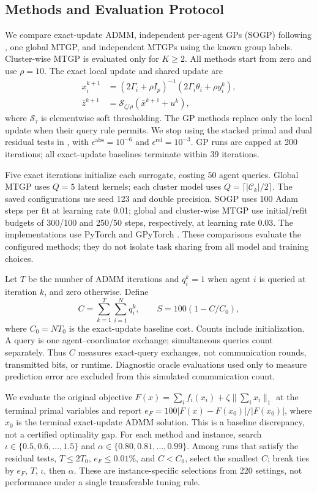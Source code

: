\subsection{Methods and Evaluation Protocol}
We compare exact-update ADMM, independent per-agent GPs (SOGP) following \cite{8635898}, one global MTGP, and independent MTGPs using the known group labels. Cluster-wise MTGP is evaluated only for $K\geq2$. All methods start from zero and use $\rho=10$. The exact local update and shared update are
\begin{equation}
\begin{aligned}
 x_i^{k+1}&=(2\Gamma_i+\rho I_p)^{-1}(2\Gamma_i\theta_i+\rho y_i^k),\\
 \bar z^{k+1}&=\mathcal S_{\zeta/\rho}(\bar x^{k+1}+u^k),
\end{aligned}
\end{equation}
where $\mathcal S_\tau$ is elementwise soft thresholding. The GP methods replace only the local update when their query rule permits. We stop using the stacked primal and dual residual tests in \cite[Sec.~3.3]{boyd2011distributed}, with $\epsilon^{\mathrm{abs}}=10^{-6}$ and $\epsilon^{\mathrm{rel}}=10^{-3}$. GP runs are capped at 200 iterations; all exact-update baselines terminate within 39 iterations.

Five exact iterations initialize each surrogate, costing 50 agent queries. Global MTGP uses $Q=5$ latent kernels; each cluster model uses $Q=\lceil|\mathcal C_k|/2\rceil$. The saved configurations use seed 123 and double precision. SOGP uses 100 Adam steps per fit at learning rate 0.01; global and cluster-wise MTGP use initial/refit budgets of 300/100 and 250/50 steps, respectively, at learning rate 0.03. The implementations use PyTorch and GPyTorch \cite{gardner2018gpytorch}. These comparisons evaluate the configured methods; they do not isolate task sharing from all model and training choices.

Let $T$ be the number of ADMM iterations and $q_i^k=1$ when agent $i$ is queried at iteration $k$, and zero otherwise. Define
\begin{equation}
 C=\sum_{k=1}^{T}\sum_{i=1}^{N}q_i^k,
 \qquad S=100(1-C/C_0),
\end{equation}
where $C_0=NT_0$ is the exact-update baseline cost. Counts include initialization. A query is one agent--coordinator exchange; simultaneous queries count separately. Thus $C$ measures exact-query exchanges, not communication rounds, transmitted bits, or runtime. Diagnostic oracle evaluations used only to measure prediction error are excluded from this simulated communication count.

We evaluate the original objective $F(x)=\sum_i f_i(x_i)+\zeta\|\sum_i x_i\|_1$ at the terminal primal variables and report $e_F=100|F(x)-F(x_0)|/|F(x_0)|$, where $x_0$ is the terminal exact-update ADMM solution. This is a baseline discrepancy, not a certified optimality gap. For each method and instance, search $\iota\in\{0.5,0.6,\ldots,1.5\}$ and $\alpha\in\{0.80,0.81,\ldots,0.99\}$. Among runs that satisfy the residual tests, $T\leq2T_0$, $e_F\leq0.01\%$, and $C<C_0$, select the smallest $C$; break ties by $e_F$, $T$, $\iota$, then $\alpha$. These are instance-specific selections from 220 settings, not performance under a single transferable tuning rule.
